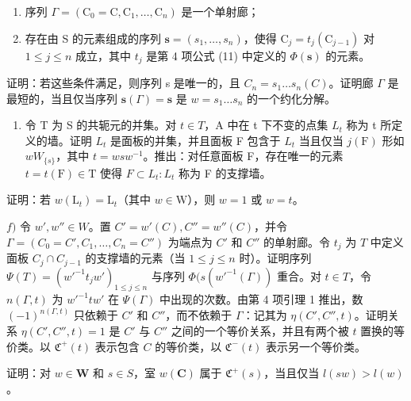 \begin{enumerate}
\def\labelenumi{(\roman{enumi})}
\item
  序列 \(\Gamma = (\mathrm{C}_0 = \mathrm{C},\mathrm{C}_1,\dots ,\mathrm{C}_n)\) 是一个单射廊；
\item
  存在由 S 的元素组成的序列 \(\mathbf{s} = (s_1, \ldots, s_n)\)，使得 \(\mathrm{C}_j = t_j(\mathrm{C}_{j-1})\) 对 \(1 \leqslant j \leqslant n\) 成立，其中 \(t_j\) 是第 4 项公式 (11) 中定义的 \(\Phi(\mathbf{s})\) 的元素。
\end{enumerate}

证明：若这些条件满足，则序列 s 是唯一的，且 \(C_{n} = s_{1} \ldots s_{n}(C)\)。证明廊 \(\Gamma\) 是最短的，当且仅当序列 \(\mathbf{s}(\Gamma) = \mathbf{s}\) 是 \(w = s_{1} \ldots s_{n}\) 的一个约化分解。

\begin{enumerate}
\def\labelenumi{\alph{enumi})}
\setcounter{enumi}{4}
\tightlist
\item
  令 T 为 S 的共轭元的并集。对 \(t \in T\)，A 中在 t 下不变的点集 \(L_{t}\) 称为 t 所定义的墙。证明 \(L_{t}\) 是面板的并集，并且面板 F 包含于 \(L_{t}\) 当且仅当 \(j(\mathrm{F})\) 形如 \(wW_{\{s\}}\)，其中 \(t = wsw^{-1}\)。推出：对任意面板 F，存在唯一的元素 \(t = t(\mathrm{F}) \in \mathrm{T}\) 使得 \(F \subset L_{t}: L_{t}\) 称为 F 的支撑墙。
\end{enumerate}

证明：若 \(w(\mathrm{L}_t) = \mathrm{L}_t\)（其中 \(w \in \mathrm{W}\)），则 \(w = 1\) 或 \(w = t\)。

\(f)\) 令 \(w', w'' \in W\)。置 \(C' = w'(C), C'' = w''(C)\)，并令 \(\Gamma = (C_0 = C', C_1, \ldots, C_n = C'')\) 为端点为 \(C'\) 和 \(C''\) 的单射廊。令 \(t_j\) 为 \(T\) 中定义面板 \(C_j \cap C_{j-1}\) 的支撑墙的元素（当 \(1 \leqslant j \leqslant n\) 时）。证明序列 \(\Psi(T) = (w'^{-1} t_j w')_{1 \leqslant j \leqslant n}\) 与序列 \(\Phi(s(w'^{-1}(\Gamma))\) 重合。对 \(t \in T\)，令 \(n(\Gamma, t)\) 为 \(w'^{-1} tw'\) 在 \(\Psi(\Gamma)\) 中出现的次数。由第 4 项引理 1 推出，数 \((-1)^{n(\Gamma, t)}\) 只依赖于 \(C'\) 和 \(C''\)，而不依赖于 \(\Gamma\)：记其为 \(\eta(C', C'', t)\)。证明关系 \(\eta(C', C'', t) = 1\) 是 \(C'\) 与 \(C''\) 之间的一个等价关系，并且有两个被 \(t\) 置换的等价类。以 \(\mathfrak{C}^+(t)\) 表示包含 \(C\) 的等价类，以 \(\mathfrak{C}^-(t)\) 表示另一个等价类。

证明：对 \(w \in \mathbf{W}\) 和 \(s \in S\)，室 \(w(\mathbf{C})\) 属于 \(\mathfrak{C}^+(s)\)，当且仅当 \(l(sw) > l(w)\)。

